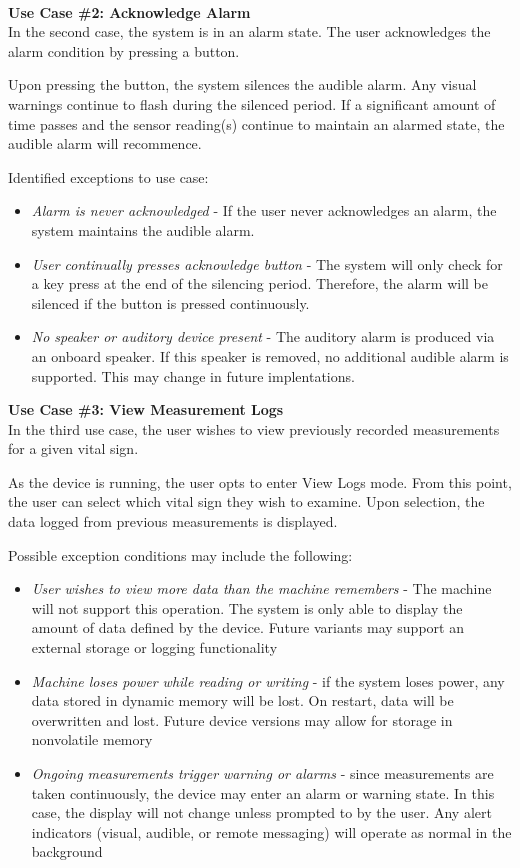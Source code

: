 \documentclass[12pt]{article} %
\begin{document}
~\\
\textbf{Use Case \#2: Acknowledge Alarm} \\
In the second case, the system is in an alarm state. The user acknowledges
the alarm condition by pressing a button.

Upon pressing the button, the system silences the audible alarm. Any visual
warnings continue to flash during the silenced period. If a significant amount
of time passes and the sensor reading(s) continue to maintain an alarmed state,
the audible alarm will recommence.

Identified exceptions to use case:
\begin{itemize}
	\item \emph{Alarm is never acknowledged} - If the user never acknowledges an alarm, the system maintains the audible alarm.
	\item \emph{User continually presses acknowledge button} - The system will
		only check for a key press at the end of the silencing period. Therefore,
		the alarm will be silenced if the button is pressed continuously.
	\item \emph{No speaker or auditory device present} - The auditory alarm is
		produced via an onboard speaker. If this speaker is removed, no additional
		audible alarm is supported. This may change in future implentations.
\end{itemize}
\textbf{Use Case \#3: View Measurement Logs} \\
In the third use case, the user wishes to view previously recorded measurements for a given vital sign.

As the device is running, the user opts to enter View Logs mode. From this
point, the user can select which vital sign they wish to examine. Upon
selection, the data logged from previous measurements is displayed.

Possible exception conditions may include the following:
\begin{itemize}
  \item \emph{User wishes to view more data than the machine remembers} - The
    machine will not support this operation. The system is only able to display
    the amount of data defined by the device. Future variants may support an
    external storage or logging functionality
  \item \emph{Machine loses power while reading or writing} - if the system
    loses power, any data stored in dynamic memory will be lost. On restart,
    data will be overwritten and lost. Future device versions may allow for
    storage in nonvolatile memory
  \item \emph{Ongoing measurements trigger warning or alarms} - since
    measurements are taken continuously, the device may enter an alarm or
    warning state. In this case, the display will not change unless prompted to
    by the user. Any alert indicators (visual, audible, or remote messaging)
    will operate as normal in the background
\end{itemize}
\end{document}
